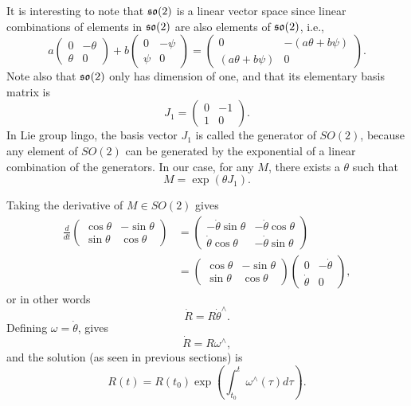 It is interesting to note that $\mathfrak{so}(2)$ is a linear vector space since linear combinations of elements in $\mathfrak{so}(2)$ are also elements of $\mathfrak{so}(2)$, i.e.,
\[
a\begin{pmatrix} 0 & -\theta \\ \theta & 0 \end{pmatrix} + b\begin{pmatrix} 0 & -\psi \\ \psi & 0 \end{pmatrix} = \begin{pmatrix} 0 & -(a\theta+b\psi) \\ (a\theta+b\psi) & 0 \end{pmatrix}.
\]
Note also that $\mathfrak{so}(2)$ only has dimension of one, and that its elementary basis matrix is 
\[
J_1 = \begin{pmatrix} 0 & -1 \\ 1 & 0 \end{pmatrix}.
\]
In Lie group lingo, the basis vector $J_1$ is called the generator of $SO(2)$, because any element of $SO(2)$ can be generated by the exponential of a linear combination of the generators.  In our case, for any $M$, there exists a $\theta$ such that
\[
M = \exp(\theta J_1).
\]

Taking the derivative of $M\in SO(2)$ gives
\begin{align*}
\frac{d}{dt}\begin{pmatrix} \cos\theta & -\sin\theta \\ \sin\theta & \cos\theta \end{pmatrix} &=
	\begin{pmatrix} -\dot{\theta}\sin\theta & -\dot{\theta}\cos\theta \\ \dot{\theta}\cos\theta & -\dot{\theta}\sin\theta \end{pmatrix} \\
	&= \begin{pmatrix} \cos\theta & -\sin\theta \\ \sin\theta & \cos\theta \end{pmatrix} \begin{pmatrix} 0 & -\dot{\theta} \\ \dot{\theta} & 0 \end{pmatrix},
\end{align*}
or in other words
\[
\dot{R} = R\dot{\theta}^\wedge.
\]
Defining $\omega = \dot{\theta}$, gives
\begin{equation}\label{eq:diff_eq_so_2}
\dot{R} = R\omega^\wedge,
\end{equation}
and the solution (as seen in previous sections) is
\[
R(t) = R(t_0)\exp\left(\int_{t_0}^t \omega^\wedge(\tau)d\tau\right).
\]

